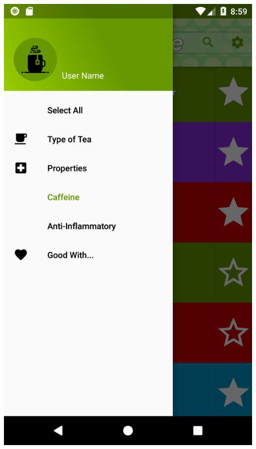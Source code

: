\documentclass[a4paper,12pt]{article}
\begin{document}
\begin{spacing}{1}
	\includegraphics*[scale=0.1]{Screenshot/05.png}    

\end{spacing}
\end{document}
